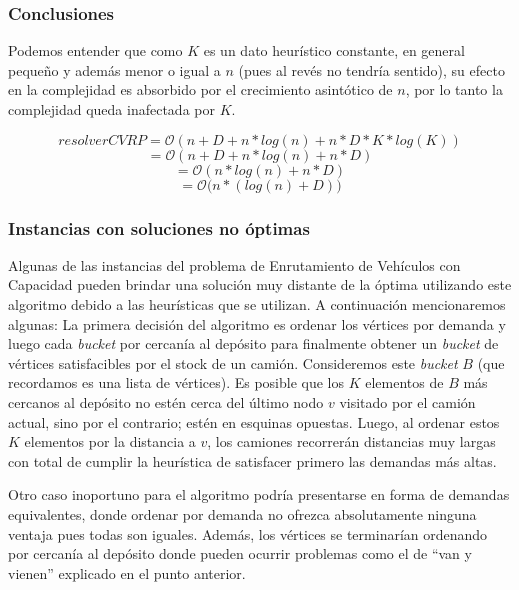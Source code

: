 \subsubsection{Conclusiones}
Podemos entender que como $K$ es un dato heurístico constante, en general pequeño y además menor o igual a $n$ (pues al revés no tendría sentido), su efecto en la complejidad es absorbido por el crecimiento asintótico de $n$, por lo tanto la complejidad queda inafectada por $K$.

$$resolverCVRP = \mathcal{O}(n+D + n*log(n) + n*D*K*log(K))$$
$$= \mathcal{O}(n+D + n*log(n) + n*D)$$
$$= \mathcal{O}(n*log(n) + n*D)$$
$$= \mathcal{O}\Big( n*(log(n) + D)\Big)$$

\subsubsection{Instancias con soluciones no óptimas}
Algunas de las instancias del problema de Enrutamiento de Vehículos con Capacidad pueden brindar una solución muy distante de la óptima utilizando este algoritmo debido a las heurísticas que se utilizan. A continuación mencionaremos algunas:
La primera decisión del algoritmo es ordenar los vértices por demanda y luego cada \textit{bucket} por cercanía al depósito para finalmente obtener un \textit{bucket} de vértices satisfacibles por el stock de un camión. Consideremos este \textit{bucket} $B$ (que recordamos es una lista de vértices). Es posible que los $K$ elementos de $B$ más cercanos al depósito no estén cerca del último nodo $v$ visitado por el camión actual, sino por el contrario; estén en esquinas opuestas. Luego, al ordenar estos $K$ elementos por la distancia a $v$, los camiones recorrerán distancias muy largas con total de cumplir la heurística de satisfacer primero las demandas más altas.

Otro caso inoportuno para el algoritmo podría presentarse en forma de demandas equivalentes, donde ordenar por demanda no ofrezca absolutamente ninguna ventaja pues todas son iguales. Además, los vértices se terminarían ordenando por cercanía al depósito donde pueden ocurrir problemas como el de ``van y vienen'' explicado en el punto anterior.

